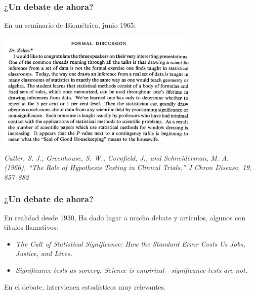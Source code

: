 \documentclass[9pt]{beamer}
\begin{document}
\begin{frame}
  \frametitle{¿Un debate de ahora?}
    \begin{overlayarea}{\textwidth}{\textheight}
  En un seminario de Biométrica, junio 1965:
  \begin{center}
    \includegraphics[width=10cm]{images/cutler_6}
  \end{center}
  \pause
  \hfill\begin{minipage}[h]{0.7\linewidth}
    {\scriptsize \textit{Cutler, S. J., Greenhouse, S. W., Cornfield, J., and Schneiderman, M. A. (1966), “The Role of Hypothesis Testing in Clinical Trials,” J Chron Disease, 19, 857–882}}
  \end{minipage}
\end{overlayarea}
\end{frame}

\begin{frame}
  \frametitle{¿Un debate de ahora?}
  En realidad desde 1930, Ha dado lugar a mucho debate y artículos,
  algunos con títulos llamativos:\bigskip\pause

  \begin{itemize}
  \item<2->  \textit{\Large The Cult of Statistical Significance: How the
      Standard Error Costs Us Jobs, Justice, and Lives.}
    \medskip
  \item<4-> \textit{\Large Significance tests as sorcery: Science is
      empirical—significance tests are not.}
   \end{itemize}
  En el debate, intervienen estadísticos muy relevantes. 
\end{frame}
\end{document}
